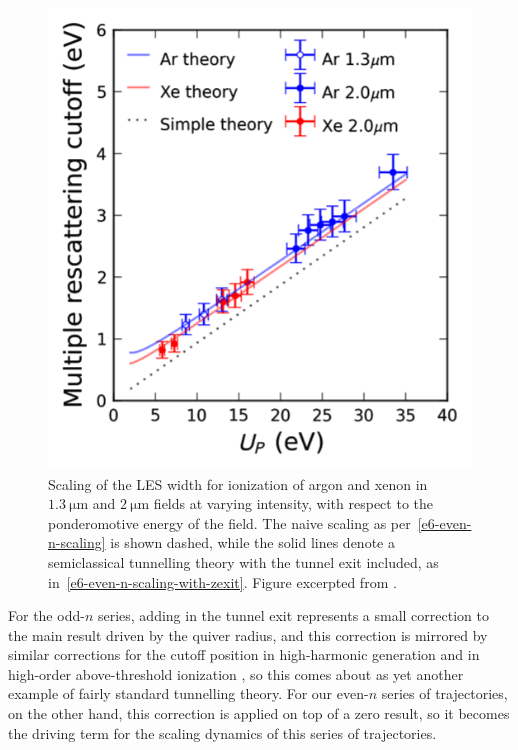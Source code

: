 \begin{figure}[ht]
  \centering
  \includegraphics[scale=1.2]{6-LES/Figures/figure6R.png}
  \caption[
  Experimental scaling of the LES width, as observed by D.D. Hickstein et al., showing departures from the naive theory caused by the tunnel width
  ]{
  Scaling of the LES width for ionization of argon and xenon in $\SI{1.3}{\micro\meter}$ and $\SI{2}{\micro\meter}$ fields at varying intensity, with respect to the ponderomotive energy of the field. The naive scaling as per~\eqref{e6-even-n-scaling} is shown dashed, while the solid lines denote a semiclassical tunnelling theory with the tunnel exit included, as in~\eqref{e6-even-n-scaling-with-zexit}.
  Figure excerpted from .
  }
\label{f6-hickstein-scaling-original-figure}
\end{figure}




For the odd-$n$ series, adding in the tunnel exit represents a small correction to the main result driven by the quiver radius, and this correction is mirrored by similar corrections for the cutoff position in high-harmonic generation \cite{LewensteinHHG} and in high-order above-threshold ionization \cite{ HATI_quantum_correction, HATI_quantum_correction_2, HATI_quantum_correction_3}, so this comes about as yet another example of fairly standard tunnelling theory. For our even-$n$ series of trajectories, on the other hand, this correction is applied on top of a zero result, so it becomes the driving term for the scaling dynamics of this series of trajectories.




